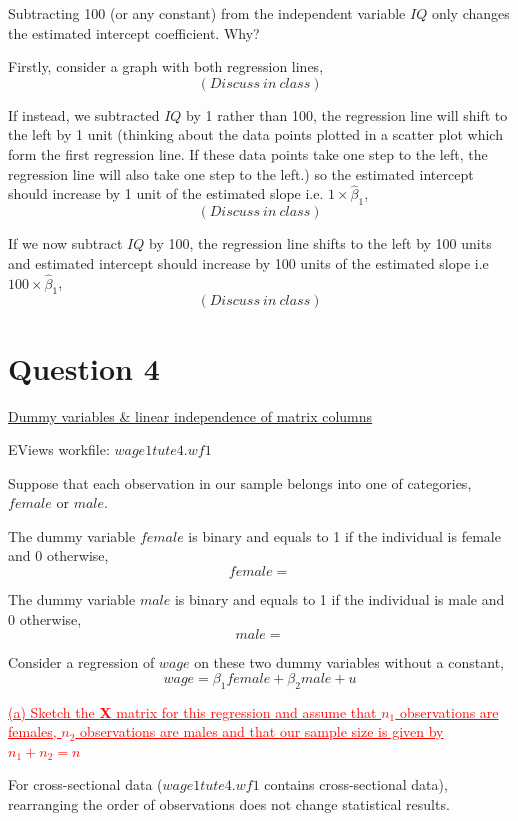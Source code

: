 \documentclass[12pt]{report}
\begin{document}
\noindent Subtracting 100 (or any constant) from the independent variable $IQ$ only changes the estimated intercept coefficient. Why?

\noindent Firstly, consider a graph with both regression lines,
$$(Discuss\ in\ class)$$
\vspace{50mm}

\noindent If instead, we subtracted $IQ$ by 1 rather than 100, the regression line will shift to the left by 1 unit (thinking about the data points plotted in a scatter plot which form the first regression line. If these data points take one step to the left, the regression line will also take one step to the left.) so the estimated intercept should increase by 1 unit of the estimated slope i.e. $1\times\hat{\beta}_1$,
$$(Discuss\ in\ class)$$
\vspace{50mm}

\noindent If we now subtract $IQ$ by 100, the regression line shifts to the left by 100 units and estimated intercept should increase by 100 units of the estimated slope i.e $100\times\hat{\beta}_1$,
$$(Discuss\ in\ class)$$
\vspace{50mm}

\newpage
\section*{Question 4}
\noindent \underline{Dummy variables \& linear independence of matrix columns}

\noindent EViews workfile: $wage1tute4.wf1$

\noindent Suppose that each observation in our sample belongs into one of categories, $female$ or $male$. 

\noindent The dummy variable $female$ is binary and equals to 1 if the individual is female and 0 otherwise, 
$$female =  $$

\noindent The dummy variable $male$ is binary and equals to 1 if the individual is male and 0 otherwise, 
$$male =  $$

\noindent Consider a regression of $wage$ on these two dummy variables without a constant,
$$wage = \beta_1female + \beta_2male + u$$

\noindent \textcolor{red}{\ul{(a) Sketch the \textbf{X} matrix for this regression and assume that $n_1$ observations are females, $n_2$ observations are males and that our sample size is given by $n_1+n_2=n$}}

\noindent For cross-sectional data ($wage1tute4.wf1$ contains cross-sectional data), rearranging the order of observations  does not change statistical results.
\end{document}
